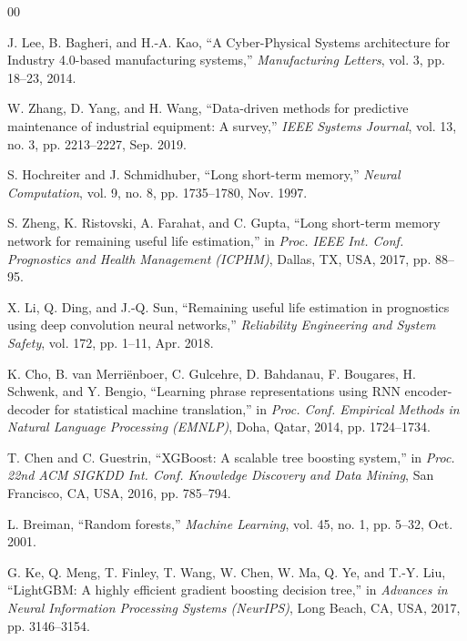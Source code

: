 \documentclass[conference]{IEEEtran}
\begin{document}

\begin{thebibliography}{00}

J. Lee, B. Bagheri, and H.-A. Kao, ``A Cyber-Physical Systems architecture for Industry 4.0-based manufacturing systems,'' \textit{Manufacturing Letters}, vol. 3, pp. 18--23, 2014.

W. Zhang, D. Yang, and H. Wang, ``Data-driven methods for predictive maintenance of industrial equipment: A survey,'' \textit{IEEE Systems Journal}, vol. 13, no. 3, pp. 2213--2227, Sep. 2019.

S. Hochreiter and J. Schmidhuber, ``Long short-term memory,'' \textit{Neural Computation}, vol. 9, no. 8, pp. 1735--1780, Nov. 1997.

S. Zheng, K. Ristovski, A. Farahat, and C. Gupta, ``Long short-term memory network for remaining useful life estimation,'' in \textit{Proc. IEEE Int. Conf. Prognostics and Health Management (ICPHM)}, Dallas, TX, USA, 2017, pp. 88--95.

X. Li, Q. Ding, and J.-Q. Sun, ``Remaining useful life estimation in prognostics using deep convolution neural networks,'' \textit{Reliability Engineering and System Safety}, vol. 172, pp. 1--11, Apr. 2018.

K. Cho, B. van Merri\"{e}nboer, C. Gulcehre, D. Bahdanau, F. Bougares, H. Schwenk, and Y. Bengio, ``Learning phrase representations using RNN encoder-decoder for statistical machine translation,'' in \textit{Proc. Conf. Empirical Methods in Natural Language Processing (EMNLP)}, Doha, Qatar, 2014, pp. 1724--1734.

T. Chen and C. Guestrin, ``XGBoost: A scalable tree boosting system,'' in \textit{Proc. 22nd ACM SIGKDD Int. Conf. Knowledge Discovery and Data Mining}, San Francisco, CA, USA, 2016, pp. 785--794.

L. Breiman, ``Random forests,'' \textit{Machine Learning}, vol. 45, no. 1, pp. 5--32, Oct. 2001.

G. Ke, Q. Meng, T. Finley, T. Wang, W. Chen, W. Ma, Q. Ye, and T.-Y. Liu, ``LightGBM: A highly efficient gradient boosting decision tree,'' in \textit{Advances in Neural Information Processing Systems (NeurIPS)}, Long Beach, CA, USA, 2017, pp. 3146--3154.


\end{thebibliography}
\end{document}
